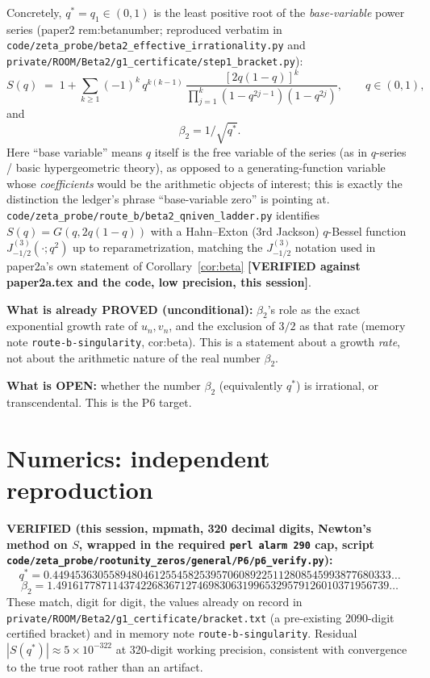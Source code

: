 \documentclass[11pt]{article}
\begin{document}
Concretely, $q^\ast=q_1\in(0,1)$ is the least positive root of the \emph{base-variable} power
series (paper2 rem:betanumber; reproduced verbatim in
\texttt{code/zeta\_probe/beta2\_effective\_irrationality.py} and
\texttt{private/ROOM/Beta2/g1\_certificate/step1\_bracket.py}):
\[
S(q) \;=\; 1 + \sum_{k\ge 1} (-1)^k \, q^{k(k-1)} \, \frac{[2q(1-q)]^k}
{\prod_{j=1}^{k}(1-q^{2j-1})(1-q^{2j})}, \qquad q\in(0,1),
\]
and
\[
\beta_2 = 1/\sqrt{q^\ast}.
\]
Here ``base variable'' means $q$ itself is the free variable of the series (as in $q$-series /
basic hypergeometric theory), as opposed to a generating-function variable whose \emph{coefficients}
would be the arithmetic objects of interest; this is exactly the distinction the ledger's phrase
``base-variable zero'' is pointing at. \texttt{code/zeta\_probe/route\_b/beta2\_qniven\_ladder.py}
identifies $S(q)=G(q,2q(1-q))$ with a Hahn--Exton (3rd Jackson) $q$-Bessel function
$J^{(3)}_{-1/2}(\cdot;q^2)$ up to reparametrization, matching the $J^{(3)}_{-1/2}$ notation used in
paper2a's own statement of Corollary~\ref{cor:beta} \textbf{[VERIFIED against paper2a.tex and
the code, low precision, this session]}.

\textbf{What is already PROVED (unconditional):} $\beta_2$'s role as the exact exponential
growth rate of $u_n,v_n$, and the exclusion of $3/2$ as that rate (memory note
\texttt{route-b-singularity}, cor:beta). This is a statement about a growth \emph{rate}, not
about the arithmetic nature of the real number $\beta_2$.

\textbf{What is OPEN:} whether the number $\beta_2$ (equivalently $q^\ast$) is irrational, or
transcendental. This is the P6 target.

\section{Numerics: independent reproduction}

\textbf{VERIFIED (this session, mpmath, 320 decimal digits, Newton's method on $S$, wrapped in
the required \texttt{perl alarm 290} cap, script
\texttt{code/zeta\_probe/rootunity\_zeros/general/P6/p6\_verify.py}):}
\[
q^\ast = 0.449453630558948046125545825395706089225112808545993877680333\ldots
\]
\[
\beta_2 = 1.49161778711437422683671274698306319965329579126010371956739\ldots
\]
These match, digit for digit, the values already on record in
\texttt{private/ROOM/Beta2/g1\_certificate/bracket.txt} (a pre-existing 2090-digit certified
bracket) and in memory note \texttt{route-b-singularity}. Residual $|S(q^\ast)|\approx
5\times10^{-322}$ at 320-digit working precision, consistent with convergence to the true root
rather than an artifact.
\end{document}
